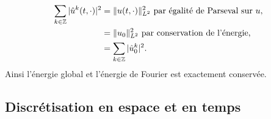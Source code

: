 \begin{align*}
\displaystyle\sum\limits_{k \in \mathbb{Z}} |\hat{u}^k(t,\cdot)|^2 & = \| u(t,\cdot) \|_{L^2}^2 \text{ par égalité de Parseval sur } u,\\
	& = \| u_0 \|_{L^2}^2 \text{ par conservation de l'énergie,}\\
	& = \displaystyle\sum\limits_{k \in \mathbb{Z}} |\hat{u}^k_0|^2.
\end{align*}
Ainsi l'énergie global et l'énergie de Fourier est exactement conservée.











\subsection{Discrétisation en espace et en temps}

